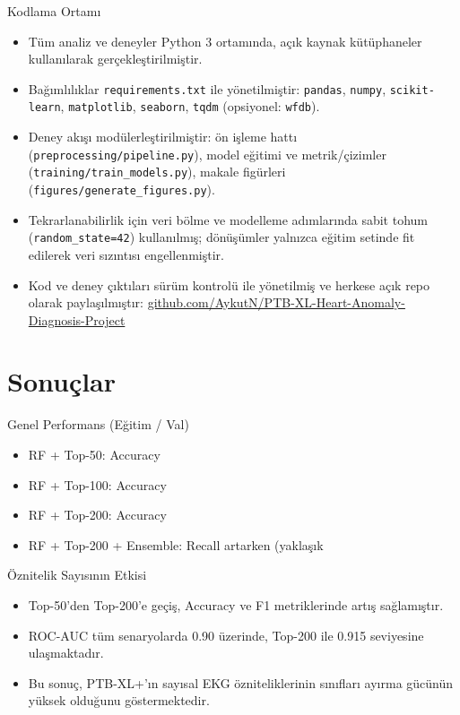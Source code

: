 \documentclass[aspectratio=169]{beamer}
\begin{document}
\begin{frame}{Kodlama Ortamı}
	\begin{itemize}
		\item Tüm analiz ve deneyler Python 3 ortamında, açık kaynak kütüphaneler kullanılarak gerçekleştirilmiştir.
		\item Bağımlılıklar \texttt{requirements.txt} ile yönetilmiştir: \texttt{pandas}, \texttt{numpy}, \texttt{scikit-learn}, \texttt{matplotlib}, \texttt{seaborn}, \texttt{tqdm} (opsiyonel: \texttt{wfdb}).
		\item Deney akışı modülerleştirilmiştir: ön işleme hattı (\texttt{preprocessing/pipeline.py}), model eğitimi ve metrik/çizimler (\texttt{training/train\_models.py}), makale figürleri (\texttt{figures/generate\_figures.py}).
		\item Tekrarlanabilirlik için veri bölme ve modelleme adımlarında sabit tohum (\texttt{random\_state=42}) kullanılmış; dönüşümler yalnızca eğitim setinde fit edilerek veri sızıntısı engellenmiştir.
		\item Kod ve deney çıktıları sürüm kontrolü ile yönetilmiş ve herkese açık repo olarak paylaşılmıştır: \href{https://github.com/AykutN/PTB-XL-Heart-Anomaly-Diagnosis-Project}{github.com/AykutN/PTB-XL-Heart-Anomaly-Diagnosis-Project}
	\end{itemize}
\end{frame}

\section{Sonuçlar}

\begin{frame}{Genel Performans (Eğitim / Val)}
	\begin{itemize}
		\item RF + Top-50: Accuracy %
		\item RF + Top-100: Accuracy %
		\item RF + Top-200: Accuracy %
		\item RF + Top-200 + Ensemble: Recall artarken (yaklaşık %
	\end{itemize}
\end{frame}

\begin{frame}{Öznitelik Sayısının Etkisi}
	\begin{itemize}
		\item Top-50'den Top-200'e geçiş, Accuracy ve F1 metriklerinde artış sağlamıştır.
		\item ROC-AUC tüm senaryolarda 0.90 üzerinde, Top-200 ile 0.915 seviyesine ulaşmaktadır.
		\item Bu sonuç, PTB-XL+'ın sayısal EKG özniteliklerinin sınıfları ayırma gücünün yüksek olduğunu göstermektedir.
	\end{itemize}
\end{frame}
\end{document}
